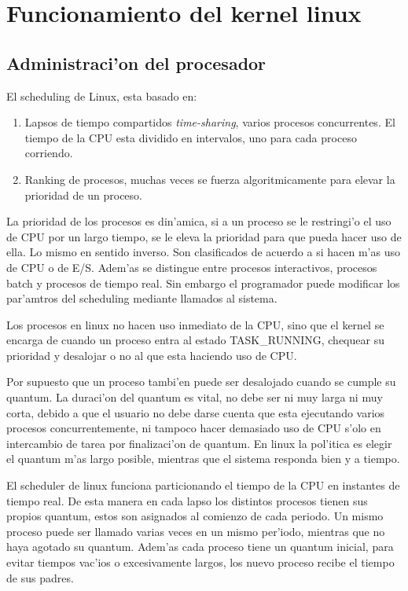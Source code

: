 \section{Funcionamiento del kernel linux}
\subsection{Administraci'on del procesador}
El scheduling de Linux, esta basado en:
\begin{enumerate}
\item Lapsos de tiempo compartidos \textit{time-sharing}, varios procesos concurrentes. El tiempo de la CPU esta dividido en intervalos, uno para cada proceso corriendo.
\item Ranking de procesos, muchas veces se fuerza algoritmicamente para elevar la prioridad de un proceso.
\end{enumerate}

La prioridad de los procesos es din'amica, si a un proceso se le restringi'o el uso de CPU por un largo tiempo, se le eleva la prioridad para que pueda hacer uso de ella. Lo mismo en sentido inverso. Son clasificados de acuerdo a si hacen m'as uso de CPU o de E/S. Adem'as se distingue entre procesos interactivos, procesos batch y procesos de tiempo real. Sin embargo el programador puede modificar los par'amtros del scheduling mediante llamados al sistema.

Los procesos en linux no hacen uso inmediato de la CPU, sino que el kernel se encarga de cuando un proceso entra al estado TASK\_RUNNING, chequear su prioridad y desalojar o no al que esta haciendo uso de CPU.

Por supuesto que un proceso tambi'en puede ser desalojado cuando se cumple su quantum. La duraci'on del quantum es vital, no debe ser ni muy larga ni muy corta, debido a que el usuario no debe darse cuenta que esta ejecutando varios procesos concurrentemente, ni tampoco hacer demasiado uso de CPU s'olo en intercambio de tarea por finalizaci'on de quantum. En linux la pol'itica es elegir el quantum m'as largo posible, mientras que el sistema responda bien y a tiempo.

El scheduler de linux funciona particionando el tiempo de la CPU en instantes de tiempo real. De esta manera en cada lapso los distintos procesos tienen sus propios quantum, estos son asignados al comienzo de cada periodo. Un mismo proceso puede ser llamado varias veces en un mismo per'iodo, mientras que no haya agotado su quantum. Adem'as cada proceso tiene un quantum inicial, para evitar tiempos vac'ios o excesivamente largos, los nuevo proceso recibe el tiempo de sus padres.


